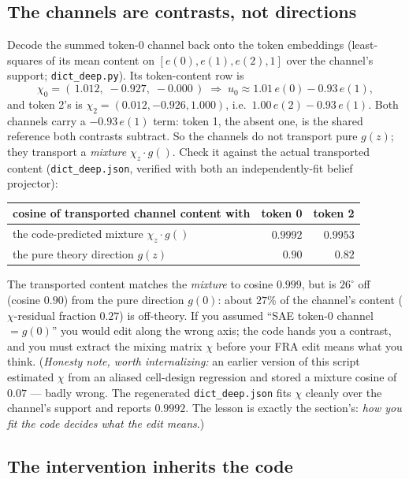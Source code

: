 \documentclass[11pt]{article}
\newcommand{\gv}[1]{g(#1)}
\begin{document}
\subsection{The channels are contrasts, not directions}

Decode the summed token-0 channel back onto the token embeddings (least-squares
of its mean content on $[e(0),e(1),e(2),1]$ over the channel's support;
\texttt{dict\_deep.py}). Its token-content row is
\[
  \chi_0 = (\,1.012,\;-0.927,\;-0.000\,)\;\Longrightarrow\;
  u_0 \approx 1.01\,e(0)-0.93\,e(1),
\]
and token 2's is $\chi_2=(0.012,-0.926,1.000)$, i.e.\ $1.00\,e(2)-0.93\,e(1)$.
Both channels carry a $-0.93\,e(1)$ term: token 1, the absent one, is the shared
reference both contrasts subtract. So the channels do not transport pure
$\gv{z}$; they transport a \emph{mixture} $\chi_z\!\cdot\!\gv{}$. Check it
against the actual transported content (\texttt{dict\_deep.json}, verified with
both an independently-fit belief projector):
\begin{center}
\begin{tabular}{lrr}
\toprule
cosine of transported channel content with & token 0 & token 2 \\
\midrule
the code-predicted mixture $\chi_z\!\cdot\!\gv{}$ & $0.9992$ & $0.9953$ \\
the pure theory direction $\gv{z}$ & $0.90$ & $0.82$ \\
\bottomrule
\end{tabular}
\end{center}
The transported content matches the \emph{mixture} to cosine $0.999$, but is
$26^\circ$ off (cosine $0.90$) from the pure direction $\gv{0}$: about $27\%$ of
the channel's content ($\chi$-residual fraction $0.27$) is off-theory. If you
assumed ``SAE token-0 channel $=\gv{0}$'' you would edit along the wrong axis;
the code hands you a contrast, and you must extract the mixing matrix $\chi$
before your FRA edit means what you think.
(\emph{Honesty note, worth internalizing:} an earlier version of this script
estimated $\chi$ from an aliased cell-design regression and stored a mixture
cosine of $0.07$ --- badly wrong. The regenerated \texttt{dict\_deep.json} fits
$\chi$ cleanly over the channel's support and reports $0.9992$. The lesson is
exactly the section's: \emph{how you fit the code decides what the edit means}.)

\subsection{The intervention inherits the code}
\end{document}
